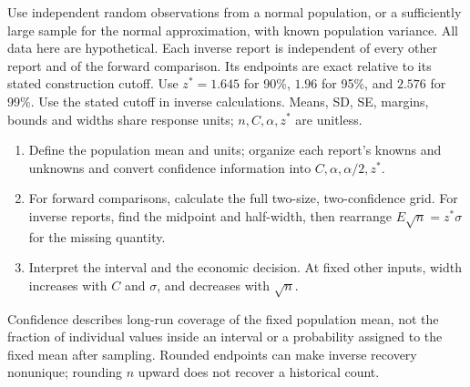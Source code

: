 Use independent random observations from a normal population, or a sufficiently large sample for the normal approximation, with known population variance. All data here are hypothetical. Each inverse report is independent of every other report and of the forward comparison. Its endpoints are exact relative to its stated construction cutoff.
Use $z^*=1.645$ for 90\%, $1.96$ for 95\%, and $2.576$ for 99\%. Use the stated cutoff in inverse calculations. Means, SD, SE, margins, bounds and widths share response units; $n,C,\alpha,z^*$ are unitless.
\begin{enumerate}[label=\arabic*.,itemsep=2pt]
\item Define the population mean and units; organize each report's knowns and unknowns and convert confidence information into $C,\alpha,\alpha/2,z^*$.
\item For forward comparisons, calculate the full two-size, two-confidence grid. For inverse reports, find the midpoint and half-width, then rearrange $E\sqrt n=z^*\sigma$ for the missing quantity.
\item Interpret the interval and the economic decision. At fixed other inputs, width increases with $C$ and $\sigma$, and decreases with $\sqrt n$.
\end{enumerate}
Confidence describes long-run coverage of the fixed population mean, not the fraction of individual values inside an interval or a probability assigned to the fixed mean after sampling. Rounded endpoints can make inverse recovery nonunique; rounding $n$ upward does not recover a historical count.

